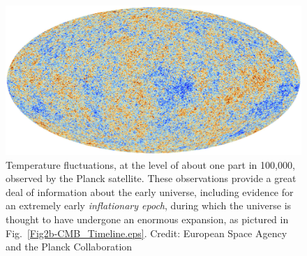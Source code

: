 \documentclass[12pt]{iopart}
\begin{document}
\begin{figure}[htbp]
\centering
 \includegraphics[bb=0 0 360 180, width=5in]{Fig2a-planck-cmb.eps}
 \caption{Temperature fluctuations, at the level of about one part in 100,000, observed by the Planck satellite. These observations provide a great deal of information about the early universe, including evidence for an extremely early \textit{inflationary epoch}, during which the universe is thought to have undergone an enormous expansion, as pictured in Fig.~\ref{Fig2b-CMB_Timeline.eps}. Credit: European Space Agency and the Planck Collaboration \label{Fig2a-planck-cmb.eps}}
 \end{figure}
\end{document}
